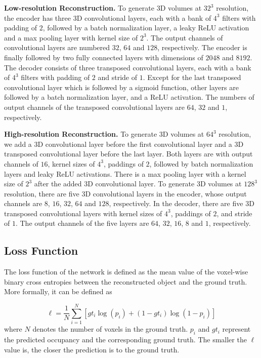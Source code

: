 \documentclass[twocolumn]{svjour3}
\begin{document}
\noindent \textbf{Low-resolution Reconstruction.}
To generate 3D volumes at $32^3$ resolution, the encoder has three 3D convolutional layers, each with a bank of $4^3$ filters with padding of $2$, followed by a batch normalization layer, a leaky ReLU activation and a max pooling layer with kernel size of $2^3$.
The output channels of convolutional layers are numbered $32$, $64$ and $128$, respectively.
The encoder is finally followed by two fully connected layers with dimensions of $2048$ and $8192$.
The decoder consists of three transposed convolutional layers, each with a bank of $4^3$ filters with padding of $2$ and stride of $1$.
Except for the last transposed convolutional layer which is followed by a sigmoid function, other layers are followed by a batch normalization layer, and a ReLU activation.
The numbers of output channels of the transposed convolutional layers are $64$, $32$ and $1$, respectively.

\noindent \textbf{High-resolution Reconstruction.}
To generate 3D volumes at $64^3$ resolution, we add a 3D convolutional layer before the first convolutional layer and a 3D transposed convolutional layer before the last layer.
Both layers are with output channels of $16$, kernel sizes of $4^3$, paddings of $2$, followed by batch normalization layers and leaky ReLU activations.
There is a max pooling layer with a kernel size of $2^3$ after the added 3D convolutional layer.
To generate 3D volumes at $128^3$ resolution, there are five 3D convolutional layers in the encoder, whose output channels are $8$, $16$, $32$, $64$ and $128$, respectively.
In the decoder, there are five 3D transposed convolutional layers with kernel sizes of $4^3$, paddings of $2$, and stride of $1$.
The output channels of the five layers are $64$, $32$, $16$, $8$ and $1$, respectively.

\subsection{Loss Function}

The loss function of the network is defined as the mean value of the voxel-wise binary cross entropies between the reconstructed object and the ground truth.
More formally, it can be defined as

\begin{equation}
  \ell = \frac{1}{N} \sum_{i=1}^N \left[ gt_i \log(p_i) + (1 - gt_i) \log(1 - p_i) \right]
  \label{eq:bce-loss}
\end{equation}
where $N$ denotes the number of voxels in the ground truth. $p_i$ and $gt_i$ represent the predicted occupancy and the corresponding ground truth.
The smaller the $\ell$ value is, the closer the prediction is to the ground truth.
\end{document}

